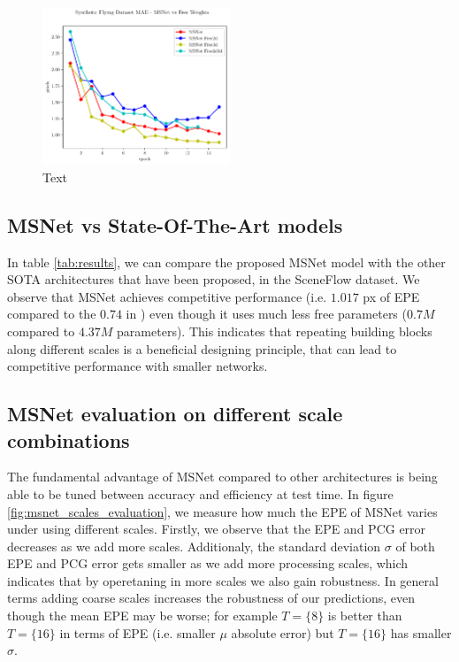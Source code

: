 \documentclass[runningheads]{llncs}
\begin{document}
\begin{figure}[!htbp]
    \centering
    \includegraphics[width=0.5\textwidth]{figures/freiburg_msnet_vs_free_weights_mae.pdf}
    \caption{Text}
    \label{fig:mae_msnet_vs_free_weights}
\end{figure}

\subsection{MSNet vs State-Of-The-Art models}

In table \ref{tab:results}, we can compare the proposed MSNet model with the other SOTA architectures that have been proposed, in the SceneFlow dataset. We observe that MSNet achieves competitive performance (i.e. $1.017$ px of EPE compared to the $0.74$ in \cite{du2019amnet}) even though it uses much less free parameters ($0.7M$ compared to $4.37M$ parameters). This indicates that repeating building blocks along different scales is a beneficial designing principle, that can lead to competitive performance with smaller networks.  

\subsection{MSNet evaluation on different scale combinations}

The fundamental advantage of MSNet compared to other architectures is being able to be tuned between accuracy and efficiency at test time. In figure \ref{fig:msnet_scales_evaluation}, we measure how much the EPE of MSNet varies under using different scales. Firstly, we observe that the EPE and PCG error decreases as we add more scales. Additionaly, the standard deviation $\sigma$ of both EPE and PCG error gets smaller as we add more processing scales, which indicates that by operetaning in more scales we also gain robustness. In general terms adding coarse scales increases the robustness of our predictions, even though the mean EPE may be worse; for example $T=\{ 8 \}$ is better than $ T = \{ 16 \}$ in terms of EPE (i.e. smaller $\mu$ absolute error) but $ T = \{ 16 \}$ has smaller $\sigma$. 
\end{document}
